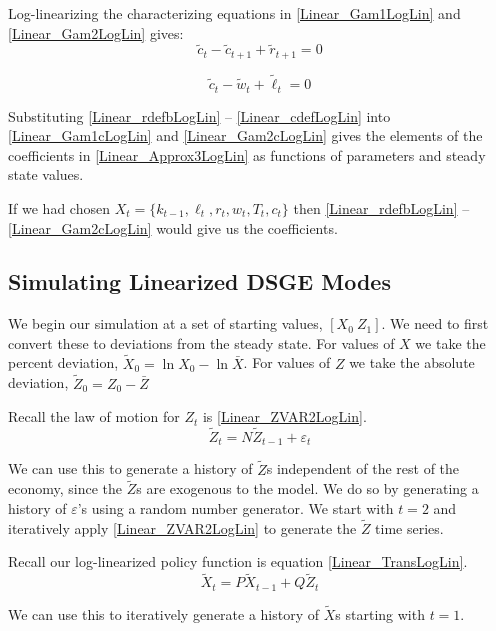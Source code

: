 \documentclass[letterpaper,12pt]{article}
\newcommand{\ve}{\varepsilon}
\theoremstyle{definition}
\begin{document}
\begin{spacing}{1.5}
		Log-linearizing the characterizing equations in \eqref{Linear_Gam1LogLin} and \eqref{Linear_Gam2LogLin} gives:
		\begin{equation}\label{Linear_Gam1cLogLin}
		\tilde c_t-\tilde c_{t+1}+\tilde r_{t+1}= 0
		\end{equation}

		\begin{equation}\label{Linear_Gam2cLogLin}
		\tilde c_t-\tilde w_t+\tilde \ell_t = 0
		\end{equation}

		Substituting \eqref{Linear_rdefbLogLin} -- \eqref{Linear_cdefLogLin} into \eqref{Linear_Gam1cLogLin} and \eqref{Linear_Gam2cLogLin} gives the elements of the coefficients in \eqref{Linear_Approx3LogLin} as functions of parameters and steady state values.

		If we had chosen $X_t = \{k_{t-1}, \ell_t, r_t, w_t, T_t, c_t\}$ then \eqref{Linear_rdefbLogLin} -- \eqref{Linear_Gam2cLogLin} would give us the coefficients.

	\subsection{Simulating Linearized DSGE Modes}
		We begin our simulation at a set of starting values, $[X_0\> Z_1]$. We need to first convert these to deviations from the steady state. For values of $X$ we take the percent deviation, $\tilde X_0 = \ln X_0 - \ln \bar X$. For values of $Z$ we take the absolute deviation, $\tilde Z_0 = Z_0 - \bar Z$

		Recall the law of motion for $Z_t$ is \eqref{Linear_ZVAR2LogLin}.
		\begin{equation}
		\tilde Z_t =  N \tilde Z_{t-1} + \ve_t \nonumber
		\end{equation}

		We can use this to generate a history of $\tilde Z$s independent of the rest of the economy, since the $\tilde Z$s are exogenous to the model. We do so by generating a history of $\ve$'s using a random number generator. We start with $t=2$ and iteratively apply \eqref{Linear_ZVAR2LogLin} to generate the $\tilde Z$ time series.

		Recall our log-linearized policy function is equation \eqref{Linear_TransLogLin}.
		\begin{equation}
		\tilde X_{t} =  P \tilde X_{t-1} + Q \tilde Z_t \nonumber
		\end{equation}

		We can use this to iteratively generate a history of $\tilde X$s starting with $t=1$.


\end{spacing}
\end{document}
